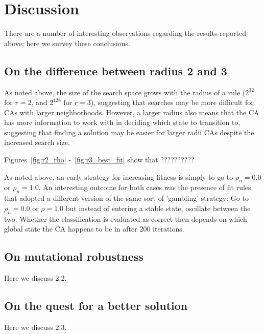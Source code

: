 \section{Discussion} \label{discussion}

There are a number of interesting observations regarding the results reported above; here we survey these 
conclusions.

\subsection{On the difference between radius 2 and 3}

As noted above, the size of the search space grows with the radius of a rule ($2^{32}$ for $r = 2$, and $2^{128}$ for $r = 3$), suggesting 
that searches may be more difficult for CAs with larger neighborhoods. However, a larger radius also means that the CA has more information 
to work with in deciding which state to transition to, suggesting that finding a solution may be easier for larger radii CAs despite the increased 
search size.

Figures~\ref{fig:r2_rho} -~\ref{fig:r3_best_fit} show that ??????????

As noted above, an early strategy for increasing fitness is simply to go to $\rho_n = 0.0$ or $\rho_n = 1.0$. An interesting outcome for both 
cases was the presence of fit rules that adopted a different version of the same sort of 'gambling' strategy: Go to $\rho_n = 0.0$ or 
$\rho = 1.0$ but instead of entering a stable state, oscillate between the two. Whether the classification is evaluated as correct then 
depends on which global state the CA happens to be in after 200 iterations.

\subsection{On mutational robustness}

Here we discuss 2.2.

\subsection{On the quest for a better solution}

Here we discuss 2.3.


